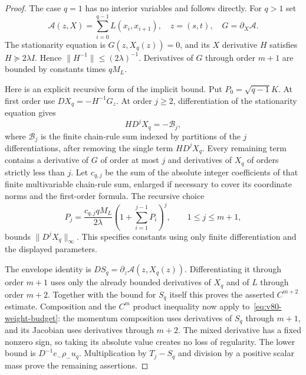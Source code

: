 \begin{proof}
The case $q=1$ has no interior variables and follows directly.
For $q>1$ set
\[
 \mathcal A(z,X)=\sum_{i=0}^{q-1}L(x_i,x_{i+1}),\quad
 z=(s,t),\quad G=\partial_X\mathcal A.
\]
The stationarity equation is $G(z,X_q(z))=0$, and its $X$ derivative
$H$ satisfies $H\succeq2\lambda I$.  Hence
$\|H^{-1}\|\le(2\lambda)^{-1}$.  Derivatives of $G$ through order
$m+1$ are bounded by constants times $qM_L$.

Here is an explicit recursive form of the implicit bound.  Put
$P_0=\sqrt{q-1}K$.  At first order use
$D X_q=-H^{-1}G_z$.  At order $j\ge2$, differentiation of the
stationarity equation gives
\[
 H D^jX_q=-\mathcal B_j,
\]
where $\mathcal B_j$ is the finite chain-rule sum indexed by partitions
of the $j$ differentiations, after removing the single term
$H D^jX_q$.  Every remaining term contains a derivative of $G$ of
order at most $j$ and derivatives of $X_q$ of orders strictly less than
$j$.  Let $c_{q,j}$ be the sum of the absolute integer coefficients of
that finite multivariable chain-rule sum, enlarged if necessary to cover
its coordinate norms and the first-order formula.  The recursive choice
\begin{equation}\label{eq:v80-implicit-recursion}
 P_j=\frac{c_{q,j}qM_L}{2\lambda}
                   \left(1+\sum_{i=1}^{j-1}P_i\right)^j,
                    \qquad 1\le j\le m+1,
\end{equation}
bounds $\|D^jX_q\|_\infty$.  This specifies constants using only
finite differentiation and the displayed parameters.

The envelope identity is
$D S_q=\partial_z\mathcal A(z,X_q(z))$.  Differentiating it through
order $m+1$ uses only the already bounded derivatives of $X_q$ and
of $L$ through order $m+2$.  Together with the bound for $S_q$ itself
this proves the asserted $C^{m+2}$ estimate.  Composition and the
$C^m$ product inequality now apply to~\eqref{eq:v80-weight-budget}:
the momentum composition uses derivatives of $S_q$ through $m+1$,
and its Jacobian uses derivatives through $m+2$.  The mixed derivative
has a fixed nonzero sign, so taking its absolute value creates no loss
of regularity.  The lower bound is
$D^{-1}e_-\rho_-u_q$.  Multiplication by $T_j-S_q$ and division by
a positive scalar mass prove the remaining assertions.
\end{proof}

